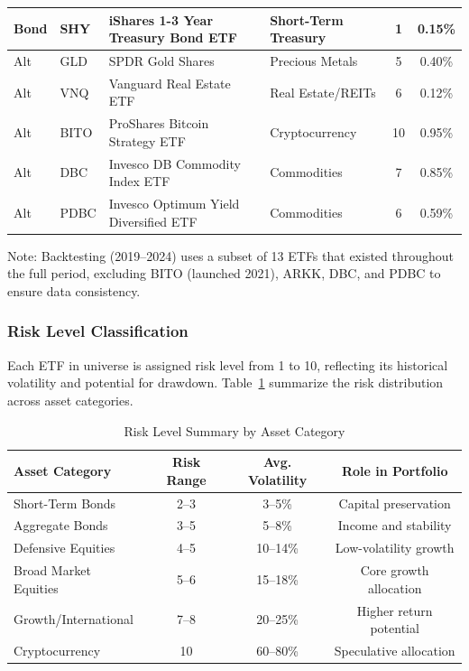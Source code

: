 \documentclass[11pt]{article}
\begin{document}
\begin{table}[H]
\begin{tabular}{llllcc}
Bond & SHY & iShares 1-3 Year Treasury Bond ETF & Short-Term Treasury & 1 & 0.15\% \\
\midrule
Alt & GLD & SPDR Gold Shares & Precious Metals & 5 & 0.40\% \\
Alt & VNQ & Vanguard Real Estate ETF & Real Estate/REITs & 6 & 0.12\% \\
Alt & BITO & ProShares Bitcoin Strategy ETF & Cryptocurrency & 10 & 0.95\% \\
Alt & DBC & Invesco DB Commodity Index ETF & Commodities & 7 & 0.85\% \\
Alt & PDBC & Invesco Optimum Yield Diversified ETF & Commodities & 6 & 0.59\% \\
\bottomrule
\end{tabular}
\end{table}

\noindent *Note: Backtesting (2019--2024) uses a subset of 13 ETFs that existed throughout the full period, excluding BITO (launched 2021), ARKK, DBC, and PDBC to ensure data consistency.

\subsubsection{Risk Level Classification}

Each ETF in universe is assigned risk level from 1 to 10, reflecting its historical volatility and potential for drawdown. Table~\ref{tab:risk-summary} summarize the risk distribution across asset categories.

\begin{table}[H]
\centering
\caption{Risk Level Summary by Asset Category}
\label{tab:risk-summary}
\begin{tabular}{lccc}
\toprule
\textbf{Asset Category} & \textbf{Risk Range} & \textbf{Avg. Volatility} & \textbf{Role in Portfolio} \\
\midrule
Short-Term Bonds & 2--3 & 3--5\% & Capital preservation \\
Aggregate Bonds & 3--5 & 5--8\% & Income and stability \\
Defensive Equities & 4--5 & 10--14\% & Low-volatility growth \\
Broad Market Equities & 5--6 & 15--18\% & Core growth allocation \\
Growth/International & 7--8 & 20--25\% & Higher return potential \\
Cryptocurrency & 10 & 60--80\% & Speculative allocation \\
\bottomrule
\end{tabular}
\end{table}
\end{document}
